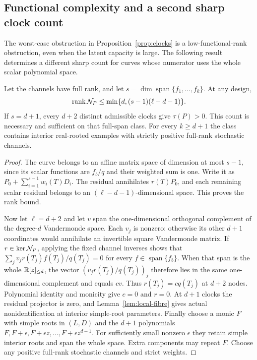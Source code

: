 \subsection{Functional complexity and a second sharp clock count}
The worst-case obstruction in Proposition~\ref{prop:clocks} is a
low-functional-rank obstruction, even when the latent capacity is
large. The following result determines a different sharp count for
curves whose numerator uses the whole scalar polynomial space.

\begin{proposition}\label{prop:full-span}
Let the channels have full rank, and let
$s=\dim\operatorname{span}\{f_1,\ldots,f_k\}$. At any design,
\[
 \operatorname{rank}\mathcal N_P\le\min\{d,(s-1)(\ell-d-1)\}.
\]
If $s=d+1$, every $d+2$ distinct admissible clocks give $\tau(P)>0$.
This count is necessary and sufficient on that full-span class.
For every $k\ge d+1$ the class contains interior real-rooted examples
with strictly positive full-rank stochastic channels.
\end{proposition}
\begin{proof}
The curve belongs to an affine matrix space of dimension at most
$s-1$, since its scalar functions are $f_b/q$ and their weighted sum
is one. Write it as $P_0+\sum_{i=1}^{s-1}w_i(T)D_i$. The residual
annihilates $r(T)P_0$, and each remaining scalar residual belongs to
an $(\ell-d-1)$-dimensional space. This proves the rank bound.

Now let $\ell=d+2$ and let $v$ span the one-dimensional orthogonal
complement of the degree-$d$ Vandermonde space. Each $v_j$ is nonzero:
otherwise its other $d+1$ coordinates would annihilate an invertible
square Vandermonde matrix. If $r\in\ker\mathcal N_P$, applying the fixed
channel inverses shows that $\sum_jv_jr(T_j)f(T_j)/q(T_j)=0$ for every
$f\in\operatorname{span}\{f_b\}$. When that span is the whole
$\mathbb R[z]_{\le d}$, the vector $(v_jr(T_j)/q(T_j))_j$ therefore lies in
the same one-dimensional complement and equals $cv$. Thus
$r(T_j)=cq(T_j)$ at $d+2$ nodes. Polynomial identity and monicity give
$c=0$ and $r=0$. At $d+1$ clocks the residual projector is zero, and
Lemma~\ref{lem:local-fibre} gives actual nonidentification at interior
simple-root parameters. Finally choose a monic $F$ with simple roots
in $(L,D)$ and the $d+1$ polynomials
$F,F+\epsilon,F+\epsilon z,\ldots,F+\epsilon z^{d-1}$.
For sufficiently small nonzero $\epsilon$ they retain simple interior
roots and span the whole space. Extra components may repeat $F$.
Choose any positive full-rank stochastic channels and strict weights.
\end{proof}
